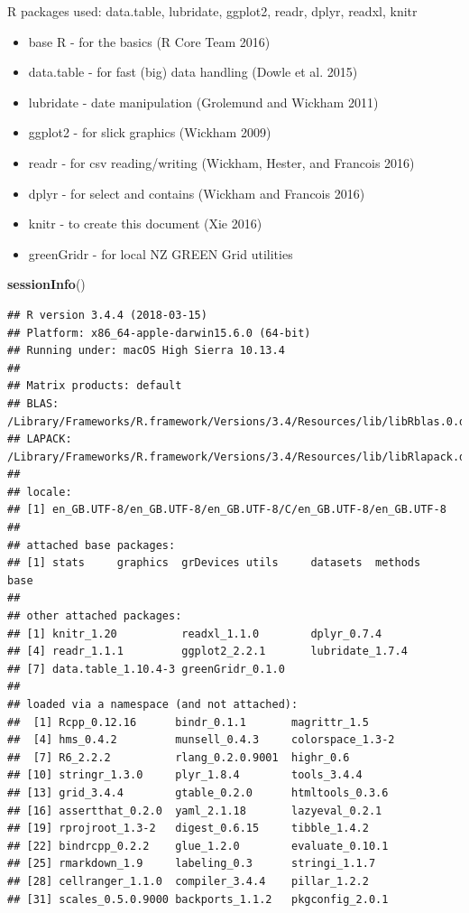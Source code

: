 \documentclass[]{article}
\newenvironment{Shaded}{\begin{snugshade}}{\end{snugshade}}
\newcommand{\KeywordTok}[1]{\textcolor[rgb]{0.13,0.29,0.53}{\textbf{#1}}}
\newcommand{\NormalTok}[1]{#1}
\providecommand{\tightlist}{%
  \setlength{\itemsep}{0pt}\setlength{\parskip}{0pt}}
\begin{document}
R packages used: data.table, lubridate, ggplot2, readr, dplyr, readxl,
knitr

\begin{itemize}
\tightlist
\item
  base R - for the basics (R Core Team 2016)
\item
  data.table - for fast (big) data handling (Dowle et al. 2015)
\item
  lubridate - date manipulation (Grolemund and Wickham 2011)
\item
  ggplot2 - for slick graphics (Wickham 2009)
\item
  readr - for csv reading/writing (Wickham, Hester, and Francois 2016)
\item
  dplyr - for select and contains (Wickham and Francois 2016)
\item
  knitr - to create this document (Xie 2016)
\item
  greenGridr - for local NZ GREEN Grid utilities
\end{itemize}

\begin{Shaded}
\begin{Highlighting}[]
\KeywordTok{sessionInfo}\NormalTok{()}
\end{Highlighting}
\end{Shaded}

\begin{verbatim}
## R version 3.4.4 (2018-03-15)
## Platform: x86_64-apple-darwin15.6.0 (64-bit)
## Running under: macOS High Sierra 10.13.4
## 
## Matrix products: default
## BLAS: /Library/Frameworks/R.framework/Versions/3.4/Resources/lib/libRblas.0.dylib
## LAPACK: /Library/Frameworks/R.framework/Versions/3.4/Resources/lib/libRlapack.dylib
## 
## locale:
## [1] en_GB.UTF-8/en_GB.UTF-8/en_GB.UTF-8/C/en_GB.UTF-8/en_GB.UTF-8
## 
## attached base packages:
## [1] stats     graphics  grDevices utils     datasets  methods   base     
## 
## other attached packages:
## [1] knitr_1.20          readxl_1.1.0        dplyr_0.7.4        
## [4] readr_1.1.1         ggplot2_2.2.1       lubridate_1.7.4    
## [7] data.table_1.10.4-3 greenGridr_0.1.0   
## 
## loaded via a namespace (and not attached):
##  [1] Rcpp_0.12.16      bindr_0.1.1       magrittr_1.5     
##  [4] hms_0.4.2         munsell_0.4.3     colorspace_1.3-2 
##  [7] R6_2.2.2          rlang_0.2.0.9001  highr_0.6        
## [10] stringr_1.3.0     plyr_1.8.4        tools_3.4.4      
## [13] grid_3.4.4        gtable_0.2.0      htmltools_0.3.6  
## [16] assertthat_0.2.0  yaml_2.1.18       lazyeval_0.2.1   
## [19] rprojroot_1.3-2   digest_0.6.15     tibble_1.4.2     
## [22] bindrcpp_0.2.2    glue_1.2.0        evaluate_0.10.1  
## [25] rmarkdown_1.9     labeling_0.3      stringi_1.1.7    
## [28] cellranger_1.1.0  compiler_3.4.4    pillar_1.2.2     
## [31] scales_0.5.0.9000 backports_1.1.2   pkgconfig_2.0.1
\end{verbatim}
\end{document}
